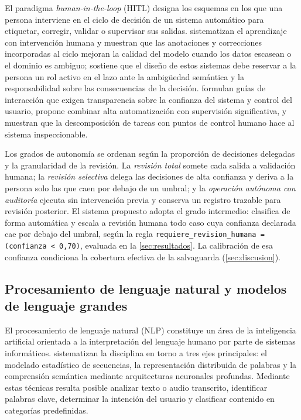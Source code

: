 El paradigma \emph{human-in-the-loop} (HITL) designa los esquemas en los que una persona interviene en el ciclo de decisión de un sistema automático para etiquetar, corregir, validar o supervisar sus salidas. \textcite{MosqueiraRey2023_human_in_the_loop} sistematizan el aprendizaje con intervención humana y muestran que las anotaciones y correcciones incorporadas al ciclo mejoran la calidad del modelo cuando los datos escasean o el dominio es ambiguo; \textcite{Zanzotto2019_human_in_the_loop} sostiene que el diseño de estos sistemas debe reservar a la persona un rol activo en el lazo ante la ambigüedad semántica y la responsabilidad sobre las consecuencias de la decisión. \textcite{Amershi2019_human_ai} formulan guías de interacción que exigen transparencia sobre la confianza del sistema y control del usuario, \textcite{Shneiderman2020_human_centered_ai} propone combinar alta automatización con supervisión significativa, y \textcite{Wu2022_ai_chains} muestran que la descomposición de tareas con puntos de control humano hace al sistema inspeccionable.

Los grados de autonomía se ordenan según la proporción de decisiones delegadas y la granularidad de la revisión. La \emph{revisión total} somete cada salida a validación humana; la \emph{revisión selectiva} delega las decisiones de alta confianza y deriva a la persona solo las que caen por debajo de un umbral; y la \emph{operación autónoma con auditoría} ejecuta sin intervención previa y conserva un registro trazable para revisión posterior. El sistema propuesto adopta el grado intermedio: clasifica de forma automática y escala a revisión humana todo caso cuya confianza declarada cae por debajo del umbral, según la regla \texttt{requiere\_revision\_humana = (confianza < 0{,}70)}, evaluada en la \autoref{sec:resultados}. La calibración de esa confianza condiciona la cobertura efectiva de la salvaguarda (\autoref{sec:discusion}).

\subsection{Procesamiento de lenguaje natural y modelos de lenguaje grandes}\label{subsec:nlp-llm}

El procesamiento de lenguaje natural (NLP) constituye un área de la inteligencia artificial orientada a la interpretación del lenguaje humano por parte de sistemas informáticos. \textcite{Jurafsky2023_speech_language} sistematizan la disciplina en torno a tres ejes principales: el modelado estadístico de secuencias, la representación distribuida de palabras y la comprensión semántica mediante arquitecturas neuronales profundas. Mediante estas técnicas resulta posible analizar texto o audio transcrito, identificar palabras clave, determinar la intención del usuario y clasificar contenido en categorías predefinidas.

